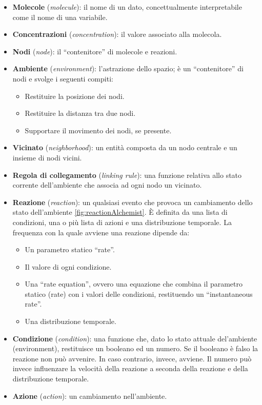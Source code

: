 \begin{itemize}
    \item \textbf{Molecole} (\textit{molecule}): il nome di un dato, concettualmente interpretabile come il nome di una variabile.
    \item \textbf{Concentrazioni} (\textit{concentration}): il valore associato alla molecola.
    \item \textbf{Nodi}\label{node} (\textit{node}): il ``contenitore'' di molecole e reazioni.
    \item \textbf{Ambiente} (\textit{environment}): l'astrazione dello spazio; è un “contenitore” di nodi e svolge i seguenti compiti:
    \begin{itemize}
        \item Restituire la posizione dei nodi.
        \item Restituire la distanza tra due nodi.
        \item Supportare il movimento dei nodi, se presente.
    \end{itemize}
    \item \textbf{Vicinato} (\textit{neighborhood}): un entità composta da un nodo centrale e un insieme di nodi vicini.
    \item \textbf{Regola di collegamento} (\textit{linking rule}): una funzione relativa allo stato corrente dell'ambiente che associa ad ogni nodo un vicinato.
    \item \textbf{Reazione} (\textit{reaction}): un qualsiasi evento che provoca un cambiamento dello stato dell'ambiente \cref{fig:reactionAlchemist}. È definita da una lista di condizioni, una o più lista di azioni e una distribuzione temporale. La frequenza con la quale avviene una reazione dipende da:
    \begin{itemize}
        \item Un parametro statico ``rate''.
        \item Il valore di ogni condizione.
        \item Una ``rate equation'', ovvero una equazione che combina il parametro statico (rate) con i valori delle condizioni, restituendo un ``instantaneous rate''.
        \item Una distribuzione temporale.
    \end{itemize}
    \item \textbf{Condizione} (\textit{condition}): una funzione che, dato lo stato attuale del'ambiente (environment), restituisce un booleano ed un numero. Se il booleano è falso la reazione non può avvenire. In caso contrario, invece, avviene. Il numero può invece influenzare la velocità della reazione a seconda della reazione e della distribuzione temporale.
    \item \textbf{Azione} (\textit{action}): un cambiamento nell'ambiente.
\end{itemize}

